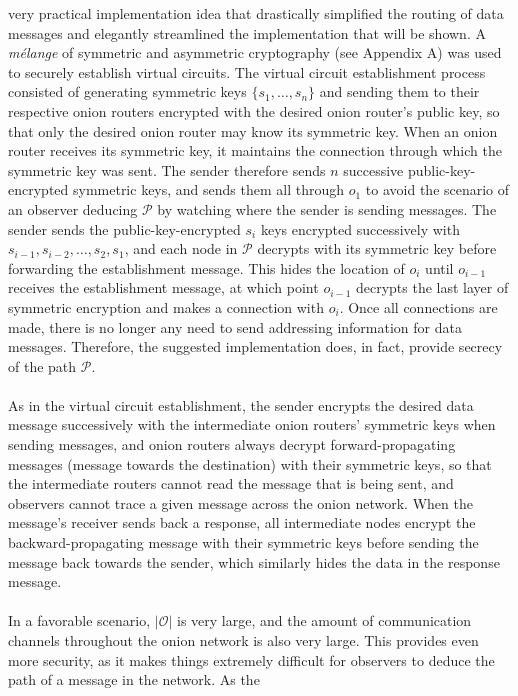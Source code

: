 \documentclass[10pt]{report}
\begin{document}
very practical implementation idea that drastically simplified the routing of data messages and
elegantly streamlined the implementation that will be shown. A \textit{m\'elange} of symmetric and
asymmetric cryptography (see Appendix A) was used to securely establish virtual circuits. The
virtual circuit establishment process consisted of generating symmetric keys $\{s_1,\dots,s_n\}$ and
sending them to their respective onion routers encrypted with the desired onion router's public key,
so that only the desired onion router may know its symmetric key. When an onion router receives its
symmetric key, it maintains the connection through which the symmetric key was sent. The sender
therefore sends $n$ successive public-key-encrypted symmetric keys, and sends them all through
$o_1$ to avoid the scenario of an observer deducing $\mathcal{P}$ by watching where the sender is
sending messages. The sender sends the public-key-encrypted $s_i$ keys encrypted successively with
$s_{i-1},s_{i-2},\dots,s_2,s_1$, and each node in $\mathcal{P}$ decrypts with its symmetric key
before forwarding the establishment message. This hides the location of $o_i$ until $o_{i-1}$
receives the establishment message, at which point $o_{i-1}$ decrypts the last layer of symmetric
encryption and makes a connection with $o_i$. Once all connections are made, there is no longer any
need to send addressing information for data messages. Therefore, the suggested implementation does,
in fact, provide secrecy of the path $\mathcal{P}$.\\\\
As in the virtual circuit establishment, the sender encrypts the desired data message successively
with the intermediate onion routers' symmetric keys when sending messages, and onion routers always
decrypt forward-propagating messages (message towards the destination) with their symmetric keys, so
that the intermediate routers cannot read the message that is being sent, and observers cannot trace
a given message across the onion network. When the message's receiver sends back a response, all
intermediate nodes encrypt the backward-propagating message with their symmetric keys before sending
the message back towards the sender, which similarly hides the data in the response message.\\\\
In a favorable scenario, $|\mathcal{O}|$ is very large, and the amount of communication channels
throughout the onion network is also very large. This provides even more security, as it makes
things extremely difficult for observers to deduce the path of a message in the network. As the
\end{document}
